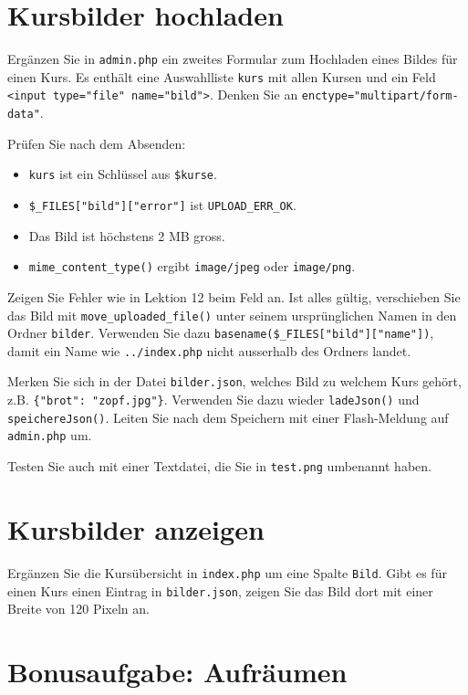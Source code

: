 \documentclass[a4paper,12pt]{article}
\begin{document}
\section{Kursbilder hochladen}

Ergänzen Sie in \texttt{admin.php} ein zweites Formular zum Hochladen eines Bildes für einen Kurs. Es enthält eine Auswahlliste \texttt{kurs} mit allen Kursen und ein Feld \texttt{<input type="{}file"{} name="{}bild"{}>}. Denken Sie an \texttt{enctype="{}multipart/form-data"{}}.

Prüfen Sie nach dem Absenden:

\begin{itemize}
    \item \texttt{kurs} ist ein Schlüssel aus \texttt{\$kurse}.
    \item \texttt{\$\_FILES["{}bild"{}]["{}error"{}]} ist \texttt{UPLOAD\_ERR\_OK}.
    \item Das Bild ist höchstens 2 MB gross.
    \item \texttt{mime\_content\_type()} ergibt \texttt{image/jpeg} oder \texttt{image/png}.
\end{itemize}

Zeigen Sie Fehler wie in Lektion 12 beim Feld an. Ist alles gültig, verschieben Sie das Bild mit \texttt{move\_uploaded\_file()} unter seinem ursprünglichen Namen in den Ordner \texttt{bilder}. Verwenden Sie dazu \texttt{basename(\$\_FILES["{}bild"{}]["{}name"{}])}, damit ein Name wie \texttt{../index.php} nicht ausserhalb des Ordners landet.

Merken Sie sich in der Datei \texttt{bilder.json}, welches Bild zu welchem Kurs gehört, z.B. \texttt{\{"{}brot"{}: "{}zopf.jpg"{}\}}. Verwenden Sie dazu wieder \texttt{ladeJson()} und \texttt{speichereJson()}. Leiten Sie nach dem Speichern mit einer Flash-Meldung auf \texttt{admin.php} um.

Testen Sie auch mit einer Textdatei, die Sie in \texttt{test.png} umbenannt haben.

\section{Kursbilder anzeigen}

Ergänzen Sie die Kursübersicht in \texttt{index.php} um eine Spalte \texttt{Bild}. Gibt es für einen Kurs einen Eintrag in \texttt{bilder.json}, zeigen Sie das Bild dort mit einer Breite von 120 Pixeln an.

\section{Bonusaufgabe: Aufräumen}
\end{document}

